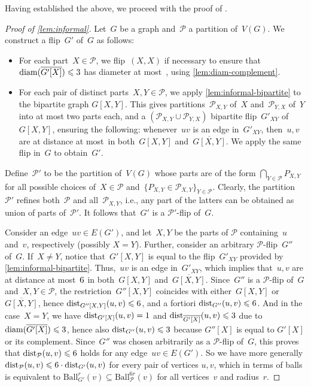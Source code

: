 \documentclass[a4paper,UKenglish,cleveref, autoref, thm-restate]{lipics-v2021}
\newcommand{\dist}{\textnormal{dist}}
\newcommand{\diam}{\textnormal{diam}}
\newcommand{\PP}{\mathcal{P}}
\renewcommand{\le}{\leqslant}
\renewcommand{\leq}{\le}
\newcommand{\Ball}{\mathrm{Ball}}
\begin{document}
Having established the above, we proceed with the proof of . 

\begin{proof}[Proof of \cref{lem:informal}]
  Let~$G$ be a graph and~$\PP$ a partition of~$V(G)$. We construct a flip~$G'$ of~$G$ as follows:
  \begin{itemize}
    \item For each part~$X \in \PP$, we flip~$(X,X)$ if necessary to ensure that~$\diam(\overline{G'[X]}) \le 3$ has diameter at most~\diamBound, using \cref{lem:diam-complement}.
    \item For each pair of distinct parts~$X,Y \in \PP$, we apply \cref{lem:informal-bipartite} to the bipartite graph $G[X,Y]$.
      This gives partitions~$\PP_{X,Y}$ of~$X$ and~$\PP_{Y,X}$ of~$Y$ into at most two parts each, and a $(\PP_{X,Y} \cup \PP_{Y,X})$ bipartite flip~$G'_{XY}$ of~$G[X,Y]$, ensuring the following:
      whenever~$uv$ is an edge in~$G'_{XY}$, then~$u,v$ are at distance at most~\diamBoundBip in both~$G[X,Y]$ and~$\overline{G[X,Y]}$.
      We apply the same flip in~$G$ to obtain~$G'$.
  \end{itemize}
  Define~$\PP'$ to be the partition of~$V(G)$ whose parts are of the form $\bigcap_{Y \in \PP} P_{X,Y}$
  for all possible choices of~$X \in \PP$ and~$\{P_{X,Y} \in \PP_{X,Y}\}_{Y \in \PP}$.
  Clearly, the partition~$\PP'$ refines both~$\PP$ and all~$\PP_{X,Y}$,
  i.e., any part of the latters can be obtained as union of parts of~$\PP'$.
  It follows that~$G'$ is a $\PP'$-flip of~$G$.

  Consider an edge~$uv \in E(G')$, and let~$X,Y$ be the parts of $\PP$ containing~$u$ and~$v$, respectively (possibly $X=Y$).
  Further, consider an arbitrary $\PP$-flip~$G''$ of~$G$.
  If~$X \neq Y$, notice that~$G'[X,Y]$ is equal to the flip~$G'_{XY}$ provided by \cref{lem:informal-bipartite}.
  Thus,~$uv$ is an edge in~$G'_{XY}$, which implies that~$u,v$ are at distance at most~$6$ in both~$G[X,Y]$ and~$\overline{G[X,Y]}$.
  Since~$G''$ is a $\PP$-flip of~$G$ and~$X,Y \in \PP$, the restriction~$G''[X,Y]$ coincides with either~$G[X,Y]$ or~$\overline{G[X,Y]}$, hence $\dist_{G''[X,Y]}(u,v) \le \diamBoundBip$, and a fortiori $\dist_{G''}(u,v) \le \diamBoundBip$.
  And in the case~$X = Y$, we have $\dist_{G'[X]}(u,v)=1$ and $\dist_{\overline{G'[X]}}(u,v)\leq 3$ due to $\diam(\overline{G'[X]})\leq 3$, hence also $\dist_{G''}(u,v)\leq 3$ because $G''[X]$ is equal to $G'[X]$ or its complement.
  Since~$G''$ was chosen arbitrarily as a $\PP$-flip of~$G$, this proves that $\dist_\PP(u,v) \le \diamBoundBip$ holds for any edge~$uv \in E(G')$.
  So we have more generally $\dist_{\PP}(u,v) \le \diamBoundBip\cdot \dist_{G'}(u,v)$ for every pair of vertices $u,v$,
  which in terms of balls is equivalent to $\Ball^{r}_{G'}(v) \subseteq \Ball^{6r}_{\PP}(v)$ for all vertices~$v$ and radius~$r$.


\end{proof}
\end{document}
